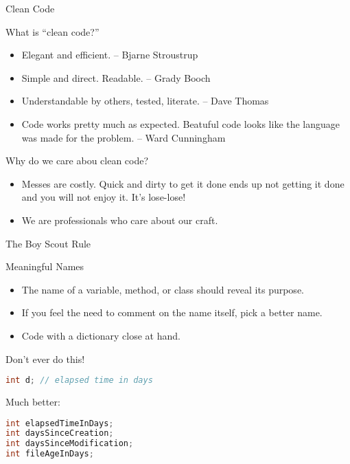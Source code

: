 \documentclass{beamer}
\author[Chris Simpkins] 
{Christopher Simpkins \\\texttt{chris.simpkins@gatech.edu}}
\institute[Georgia Tech] %
\date[CS 1331]{}
\begin{document}
\begin{frame}
  \titlepage
\end{frame}



\begin{frame}[fragile]{Clean Code}


What is ``clean code?''
\begin{itemize}
\item Elegant and efficient. -- Bjarne Stroustrup
\item Simple and direct. Readable.  -- Grady Booch
\item Understandable by others, tested, literate. -- Dave Thomas
\item Code works pretty much as expected.  Beatuful code looks like the language was made for the problem. -- Ward Cunningham
\end{itemize}

Why do we care abou clean code?
\begin{itemize}
\item Messes are costly.  Quick and dirty to get it done ends up not getting it done and you will not enjoy it.  It's lose-lose!
\item We are professionals who care about our craft. 
\end{itemize}

The Boy Scout Rule

\end{frame}

\begin{frame}[fragile]{Meaningful Names}


\begin{itemize}
\item The name of a variable, method, or class should reveal its purpose.
\item If you feel the need to comment on the name itself, pick a better name.
\item Code with a dictionary close at hand.
\end{itemize}

Don't ever do this!
\begin{lstlisting}[language=Java]
int d; // elapsed time in days
\end{lstlisting}

Much better:
\begin{lstlisting}[language=Java]
int elapsedTimeInDays;
int daysSinceCreation;
int daysSinceModification;
int fileAgeInDays;
\end{lstlisting}


\end{frame}
\end{document}
